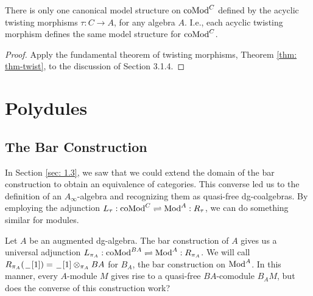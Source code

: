 \documentclass[../thesis.tex]{subfiles}
\begin{document}
            \begin{corollary}
                There is only one canonical model structure on $\tt{coMod}^C$ defined by the acyclic twisting morphisms $\tau: C \rightarrow A$, for any algebra $A$. I.e., each acyclic twisting morphism defines the same model structure for $\tt{coMod}^C$. 
            \end{corollary}

            \begin{proof}
                Apply the fundamental theorem of twisting morphisms, Theorem \ref{thm: thm-twist}, to the discussion of Section 3.1.4.
            \end{proof}

    \section{Polydules}
        \subsection{The Bar Construction}
            In Section \ref{sec: 1.3}, we saw that we could extend the domain of the bar construction to obtain an equivalence of categories. This converse led us to the definition of an $A_\infty$-algebra and recognizing them as quasi-free dg-coalgebras. By employing the adjunction $L_\tau : \tt{coMod}^C \rightleftharpoons \tt{Mod}^A : R_\tau$, we can do something similar for modules.

            Let $A$ be an augmented dg-algebra. The bar construction of $A$ gives us a universal adjunction $L_{\pi_A} : \tt{coMod}^{BA} \rightleftharpoons \tt{Mod}^A : R_{\pi_A}$. We will call $R_{\pi_A}(\argument [1]) = \argument [1]\otimes_{\pi_A}BA$ for $B_A$, the bar construction on $\tt{Mod}^A$. In this manner, every $A$-module $M$ gives rise to a quasi-free $BA$-comodule $B_AM$, but does the converse of this construction work?
\end{document}
